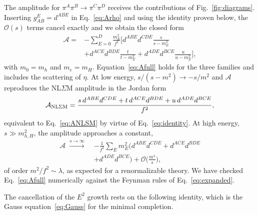 \documentclass[aps,prd,twocolumn,superscriptaddress,nofootinbib,floatfix]{revtex4-2}
\theoremstyle{remark}
\begin{document}
The amplitude for $\pi^A\pi^B\to\pi^C\pi^D$ receives the contributions of Fig.~\ref{fig:diagrams}. Inserting $g^E_{AB}=d^{ABE}$ in Eq.~\eqref{eq:Arho} and using the identity proven below, the $\mathcal{O}(s)$ terms cancel exactly and we obtain the closed form
\begin{equation}
\begin{split}
\mathcal{A}={}&-\sum_{E=0}^{D}\frac{m_E^2}{f^2}\bigg[d^{ABE}d^{CDE}\frac{s}{s-m_E^2}\\
&+d^{ACE}d^{BDE}\frac{t}{t-m_E^2}+d^{ADE}d^{BCE}\frac{u}{u-m_E^2}\bigg],
\end{split}
\label{eq:Afull}
\end{equation}
with $m_0=m_h$ and $m_{e}=m_H$. Equation~\eqref{eq:Afull} holds for the three families and includes the scattering of $\eta$. At low energy, $s/(s-m^2)\to-s/m^2$ and $\mathcal{A}$ reproduces the NL$\Sigma$M amplitude in the Jordan form
\begin{equation}
\mathcal{A}_{\rm NL\Sigma M}=\frac{s\,d^{ABE}d^{CDE}+t\,d^{ACE}d^{BDE}+u\,d^{ADE}d^{BCE}}{f^2},
\label{eq:ANLSMd}
\end{equation}
equivalent to Eq.~\eqref{eq:ANLSM} by virtue of Eq.~\eqref{eq:identity}. At high energy, $s\gg m_{h,H}^2$, the amplitude approaches a constant,
\begin{equation}
\begin{split}
\mathcal{A}\;\xrightarrow{s\to\infty}\;&-\frac{1}{f^2}\sum_E m_E^2\big(d^{ABE}d^{CDE}+d^{ACE}d^{BDE}\\&+d^{ADE}d^{BCE}\big)+\mathcal{O}\Big(\frac{m^4}{s}\Big),
\end{split}
\label{eq:Ainf}
\end{equation}
of order $m^2/f^2\sim\lambda$, as expected for a renormalizable theory. We have checked Eq.~\eqref{eq:Afull} numerically against the Feynman rules of Eq.~\eqref{eq:expanded}.

The cancellation of the $E^2$ growth rests on the following identity, which is the Gauss equation~\eqref{eq:Gauss} for the minimal completion.
\end{document}
